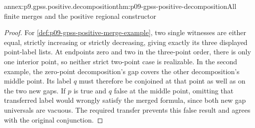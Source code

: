 \begin{annexitem}{annex:p9.gpss.positive.decomposition}{thm:p09-gpss-positive-decomposition}{All finite merges and the positive regional constructor}
\begin{proof}
For \cref{def:p09-gpss-positive-merge-example}, two single
witnesses are either equal, strictly increasing or strictly
decreasing, giving exactly its three displayed point-label
lists. At endpoints zero and two in the three-point order,
there is only one interior point, so neither strict two-point
case is realizable. In the second example, the zero-point
decomposition's gap covers the other decomposition's middle
point. Its label \(q\) must therefore be conjoined at that
point as well as on the two new gaps. If \(p\) is true and
\(q\) false at the middle point, omitting that transferred
label would wrongly satisfy the merged formula, since both
new gap universals are vacuous. The required transfer prevents
this false result and agrees with the original conjunction.
\end{proof}
\end{annexitem}


